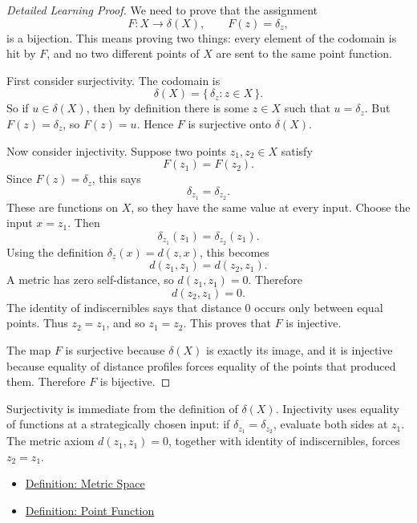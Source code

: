 \begin{proof}[Detailed Learning Proof]
\LRAProofBodyStart
We need to prove that the assignment
\[
  F:X\to\delta(X),
  \qquad
  F(z)=\delta_z,
\]
is a bijection.  This means proving two things: every element of the codomain
is hit by \(F\), and no two different points of \(X\) are sent to the same
point function.

First consider surjectivity.  The codomain is
\[
  \delta(X)=\{\,\delta_z:z\in X\,\}.
\]
So if \(u\in\delta(X)\), then by definition there is some \(z\in X\) such
that \(u=\delta_z\).  But \(F(z)=\delta_z\), so \(F(z)=u\).  Hence \(F\) is
surjective onto \(\delta(X)\).

Now consider injectivity.  Suppose two points \(z_1,z_2\in X\) satisfy
\[
  F(z_1)=F(z_2).
\]
Since \(F(z)=\delta_z\), this says
\[
  \delta_{z_1}=\delta_{z_2}.
\]
These are functions on \(X\), so they have the same value at every input.
Choose the input \(x=z_1\).  Then
\[
  \delta_{z_1}(z_1)=\delta_{z_2}(z_1).
\]
Using the definition \(\delta_z(x)=d(z,x)\), this becomes
\[
  d(z_1,z_1)=d(z_2,z_1).
\]
A metric has zero self-distance, so \(d(z_1,z_1)=0\).  Therefore
\[
  d(z_2,z_1)=0.
\]
The identity of indiscernibles says that distance \(0\) occurs only between
equal points.  Thus \(z_2=z_1\), and so \(z_1=z_2\).  This proves that \(F\)
is injective.

The map \(F\) is surjective because \(\delta(X)\) is exactly its image, and it
is injective because equality of distance profiles forces equality of the
points that produced them.  Therefore \(F\) is bijective.
\end{proof}

\begin{remark*}
Surjectivity is immediate from the definition of \(\delta(X)\).  Injectivity
uses equality of functions at a strategically chosen input: if
\(\delta_{z_1}=\delta_{z_2}\), evaluate both sides at \(z_1\).  The metric
axiom \(d(z_1,z_1)=0\), together with identity of indiscernibles, forces
\(z_2=z_1\).
\end{remark*}

\begin{dependencies}
\begin{itemize}
  \item \hyperref[def:metric-space]{Definition: Metric Space}
  \item \hyperref[def:metric-point-function]{Definition: Point Function}
\end{itemize}
\end{dependencies}

\clearpage
